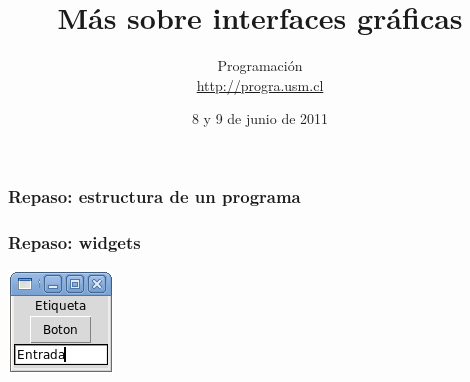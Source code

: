 \documentclass[12pt]{beamer}
\title{Más sobre interfaces gráficas}
\author{Programación \\ \url{http://progra.usm.cl}}
\date{8 y 9 de junio de 2011}
\begin{document}
  \begin{frame}
    \maketitle
  \end{frame}

  \begin{frame}
    \label{repaso-estructura}
    \frametitle{Repaso: estructura de un programa}
    \LARGE
    
  \end{frame}

  \begin{frame}
    \label{repaso-widgets}
    \frametitle{Repaso: widgets}
    \hfil
    \includegraphics[width=.5\textwidth]{programas/tkinter/capturas/widgets.png}
    \hfil
  \end{frame}
\end{document}

